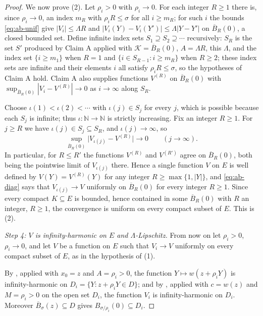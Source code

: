 \begin{proof}
We now prove (2). Let $\rho_i>0$ with $\rho_i\to0$. For each integer $R\ge1$
there is, since $\rho_i\to0$, an index $m_R$ with $\rho_iR\le\sigma$ for all
$i\ge m_R$; for such $i$ the bounds \eqref{eq:ab-unif} give
$|V_i|\le\Lambda R$ and $|V_i(Y)-V_i(Y')|\le\Lambda|Y-Y'|$ on
$\overline B_R(0)$, a closed bounded set. Define infinite index sets
$S_1\supseteq S_2\supseteq\cdots$ recursively: $S_R$ is the set $S'$ produced by
Claim A applied with $\mathcal K=\overline B_R(0)$, $A=\Lambda R$, this
$\Lambda$, and the index set $\{i\ge m_1\}$ when $R=1$ and
$\{i\in S_{R-1}:i\ge m_R\}$ when $R\ge2$; these index sets are infinite and
their elements $i$ all satisfy $\rho_iR\le\sigma$, so the hypotheses of Claim A
hold. Claim A also supplies functions $V^{(R)}$ on $\overline B_R(0)$ with
$\sup_{\overline B_R(0)}|V_i-V^{(R)}|\to0$ as $i\to\infty$ along $S_R$.

Choose $\iota(1)<\iota(2)<\cdots$ with $\iota(j)\in S_j$ for every $j$, which is
possible because each $S_j$ is infinite; thus $\iota:\mathbb N\to\mathbb N$ is
strictly increasing. Fix an integer $R\ge1$. For $j\ge R$ we have
$\iota(j)\in S_j\subseteq S_R$, and $\iota(j)\to\infty$, so
\begin{equation}\label{eq:ab-diag}
  \sup_{\overline B_R(0)}\bigl|V_{\iota(j)}-V^{(R)}\bigr|\longrightarrow0
  \qquad(j\to\infty).
\end{equation}
In particular, for $R\le R'$ the functions $V^{(R)}$ and $V^{(R')}$ agree on
$\overline B_R(0)$, both being the pointwise limit of $V_{\iota(j)}$ there.
Hence a single function $V$ on $E$ is well defined by $V(Y)=V^{(R)}(Y)$ for any
integer $R\ge\max\{1,|Y|\}$, and \eqref{eq:ab-diag} says that
$V_{\iota(j)}\to V$ uniformly on $\overline B_R(0)$ for every integer $R\ge1$.
Since every compact $K\subseteq E$ is bounded, hence contained in some
$\overline B_R(0)$ with $R$ an integer, $R\ge1$, the convergence is uniform on
every compact subset of $E$. This is (2).

\emph{Step 4: $V$ is infinity-harmonic on $E$ and $\Lambda$-Lipschitz.}
From now on let $\rho_i>0$, $\rho_i\to0$, and let $V$ be a function on $E$ such
that $V_i\to V$ uniformly on every compact subset of $E$, as in the hypothesis
of (1).

By , applied with $x_0=z$ and $A=\rho_i>0$, the
function $Y\mapsto w(z+\rho_iY)$ is infinity-harmonic on
$D_i=\{Y:z+\rho_iY\in D\}$; and by , applied with
$c=w(z)$ and $M=\rho_i>0$ on the open set $D_i$, the function $V_i$ is
infinity-harmonic on $D_i$. Moreover $\overline B_\sigma(z)\subseteq D$ gives
$B_{\sigma/\rho_i}(0)\subseteq D_i$.


\end{proof}
